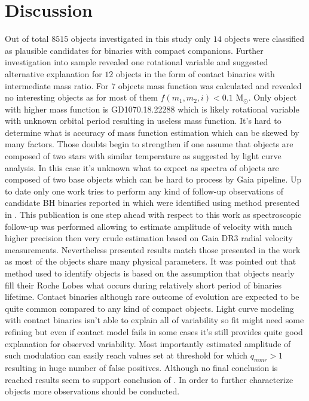 \documentclass{pracalicmgr}
\begin{document}
\chapter{Discussion}
Out of total $8515$ objects investigated in this study only $14$ objects were classified as plausible candidates for binaries with compact companions.
Further investigation into sample revealed one rotational variable and suggested alternative explanation for $12$ objects in the form of
contact binaries with intermediate mass ratio. For $7$ objects mass function was calculated and revealed no interesting objects as for most of them 
$f(m_1,m_2,i)<0.1$ M$_{\odot}$. Only object with higher mass function is GD1070.18.22288 which is likely rotational variable with unknown orbital period 
resulting in useless mass function. It's hard to determine what is accuracy of mass function estimation  which can be skewed by many factors.
Those doubts begin to strengthen if one assume that objects are composed of two stars with similar temperature as suggested by light curve analysis.
In this case it's unknown what to expect as spectra of objects are composed of two base objects which can be hard to process by Gaia pipeline.
Up to date only one work \citep{nagarajan_spectroscopic_2023} tries to perform any kind of follow-up observations of 
candidate BH binaries reported in \citep{gomel_gaia_2022} which were identified using method presented in \citep{gomel_search_2021}. 
This publication is one step ahead with respect to this work as spectroscopic follow-up was performed allowing to estimate amplitude of velocity 
with much higher precision then very crude estimation based on Gaia DR3 radial velocity measurements. Nevertheless presented results match those 
presented in the work as most of the objects share many physical parameters. It was pointed out that 
method used to identify objects is based on the assumption that objects nearly fill their Roche Lobes what occurs during relatively
short period of binaries lifetime. Contact binaries although rare outcome of evolution are expected to be quite common compared to any kind of compact 
objects. Light curve modeling with contact binaries isn't able to explain all of variability so fit might need some refining but even if 
contact model fails in some cases it's still provides quite good explanation for observed variability. Most importantly estimated amplitude of such 
modulation can easily reach values set at threshold for which $q_{mmr}>1$ resulting in huge number of false positives.
Although no final conclusion is reached results seem to support conclusion of \citep{nagarajan_spectroscopic_2023}. In order to further 
characterize objects more observations should be conducted.
\end{document}
